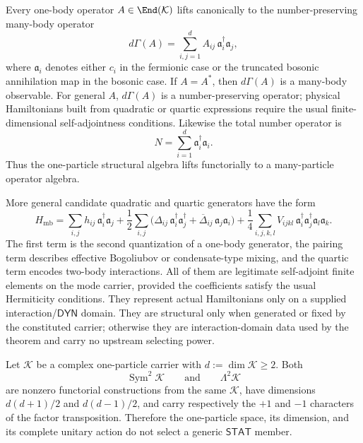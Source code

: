 \documentclass[12pt,a4paper]{article}
\begin{document}
Every one-body operator $A\in\End(\mathcal K)$ lifts canonically to the number-preserving many-body operator
\begin{equation}
\label{p4:eq:dGamma}
d\Gamma(A)
=
\sum_{i,j=1}^d A_{ij}\,\mathfrak a_i^\dagger \mathfrak a_j,
\end{equation}
where $\mathfrak a_i$ denotes either $c_i$ in the fermionic case or the truncated bosonic annihilation map in the bosonic case.
If $A=A^*$, then $d\Gamma(A)$ is a many-body observable. For general $A$, $d\Gamma(A)$ is a number-preserving operator; physical Hamiltonians built from quadratic or quartic expressions require the usual finite-dimensional self-adjointness conditions.
Likewise the total number operator is
\begin{equation}
\label{p4:eq:number-op}
N
=
\sum_{i=1}^d \mathfrak a_i^\dagger \mathfrak a_i.
\end{equation}
Thus the one-particle structural algebra lifts functorially to a many-particle operator algebra.

More general candidate quadratic and quartic generators have the form
\begin{equation}
\label{p4:eq:many-body-hamiltonian}
H_{\mathrm{mb}}
=
\sum_{i,j} h_{ij}\,\mathfrak a_i^\dagger \mathfrak a_j
+
\frac12\sum_{i,j} \bigl(\Delta_{ij}\,\mathfrak a_i^\dagger \mathfrak a_j^\dagger + \overline{\Delta}_{ij}\,\mathfrak a_j \mathfrak a_i\bigr)
+
\frac14\sum_{i,j,k,l} V_{ijkl}\,\mathfrak a_i^\dagger \mathfrak a_j^\dagger \mathfrak a_l \mathfrak a_k.
\end{equation}
The first term is the second quantization of a one-body generator, the pairing term describes effective Bogoliubov or condensate-type mixing, and the quartic term encodes two-body interactions.
All of them are legitimate self-adjoint finite elements on the mode carrier,
provided the coefficients satisfy the usual Hermiticity conditions.  They
represent actual Hamiltonians only on a supplied interaction/\(\mathsf{DYN}\)
domain.  They are structural only when generated or fixed by the constituted
carrier; otherwise they are interaction-domain data used by the theorem and
carry no upstream selecting power.


\begin{proposition}
\label{p4:prop:one-particle-does-not-select-statistics}
Let \(\mathcal K\) be a complex one-particle carrier with
\(d:=\dim\mathcal K\ge2\).  Both
\[
 \operatorname{Sym}^2\mathcal K
 \qquad\text{and}\qquad
 \Lambda^2\mathcal K
\]
are nonzero functorial constructions from the same \(\mathcal K\), have
dimensions \(d(d+1)/2\) and \(d(d-1)/2\), and carry respectively the
\(+1\) and \(-1\) characters of the factor transposition.  Therefore the
one-particle space, its dimension, and its complete unitary action do not
select a generic \(\mathsf{STAT}\) member.
\end{proposition}
\end{document}
